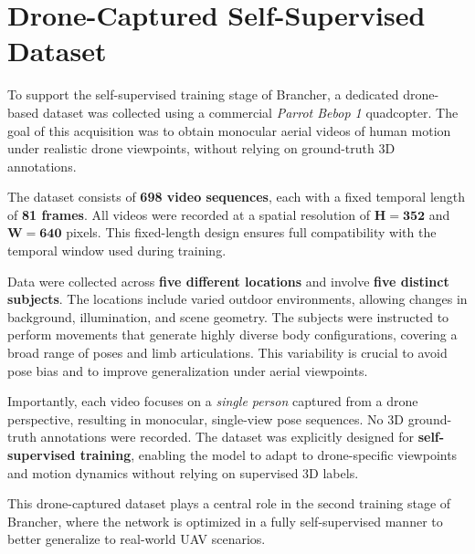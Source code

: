 \section{Drone-Captured Self-Supervised Dataset}
\label{appendix:drone_dataset}

To support the self-supervised training stage of Brancher, a dedicated drone-based dataset was collected using a commercial \textit{Parrot Bebop 1} quadcopter.
The goal of this acquisition was to obtain monocular aerial videos of human motion under realistic drone viewpoints, without relying on ground-truth 3D annotations.

The dataset consists of \textbf{698 video sequences}, each with a fixed temporal length of \textbf{81 frames}. All videos were recorded at a spatial resolution of $\mathbf{H=352}$ and $\mathbf{W=640}$ 
pixels. This fixed-length design ensures full compatibility with the temporal window used during training.

Data were collected across \textbf{five different locations} and involve \textbf{five distinct subjects}. The locations include varied outdoor environments, allowing changes in background, 
illumination, and scene geometry. The subjects were instructed to perform movements that generate highly diverse body configurations, covering a broad range of poses and limb articulations. This 
variability is crucial to avoid pose bias and to improve generalization under aerial viewpoints.

Importantly, each video focuses on a \textit{single person} captured from a drone perspective, resulting in monocular, single-view pose sequences. No 3D ground-truth annotations were recorded. The 
dataset was explicitly designed for \textbf{self-supervised training}, enabling the model to adapt to drone-specific viewpoints and motion dynamics without relying on supervised 3D labels.

This drone-captured dataset plays a central role in the second training stage of Brancher, where the network is optimized in a fully self-supervised manner to better generalize to real-world UAV 
scenarios.

